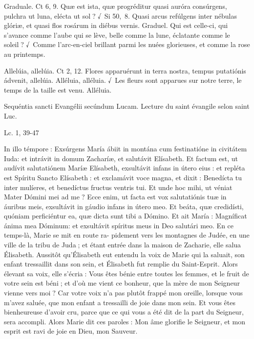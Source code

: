 \begin{paracol}{2}
Graduale. Ct 6, 9. Quæ est ista, quæ progréditur quasi auróra consúrgens, pulchra ut luna, elécta ut sol ? √~Si 50, 8. Quasi arcus refúlgens inter nébulas glóriæ, et quasi flos rosárum in diébus vernis.
\switchcolumn
Graduel. Qui est celle-ci, qui s’avance comme l’aube qui se lève, belle comme la lune, éclatante comme le soleil ? √~Comme l’arc-en-ciel brillant parmi les nuées glorieuses, et comme la rose au printemps.
\switchcolumn*

Allelúia, allelúia. Ct 2, 12. Flores apparuérunt in terra nostra, tempus putatiónis ádvenit, allelúia.
\switchcolumn
Alléluia, alléluia. √~Les fleurs sont apparues sur notre terre, le temps de la taille est venu. Alléluia.
\switchcolumn*

Sequéntia sancti Evangélii secúndum Lucam.
\switchcolumn
Lecture du saint évangile selon saint Luc.
\switchcolumn*

Lc. 1, 39-47
\switchcolumn

\switchcolumn*

In illo témpore : Exsúrgens María ábiit in montána cum festinatióne in civitátem Iuda: et intrávit in domum Zacharíæ, et salutávit Elísabeth. Et factum est, ut audívit salutatiónem Maríæ Elísabeth, exsultávit infans in útero eius : et repléta est Spíritu Sancto Elísabeth : et exclamávit voce magna, et dixit : Benedícta tu inter mulíeres, et benedíctus fructus ventris tui. Et unde hoc mihi, ut véniat Mater Dómini mei ad me ? Ecce enim, ut facta est vox salutatiónis tuæ in áuribus meis, exsultávit in gáudio infans in útero meo. Et beáta, quæ credidísti, quóniam perficiéntur ea, quæ dicta sunt tibi a Dómino. Et ait María : Magníficat ánima mea Dóminum: et exsultávit spíritus meus in Deo salutári meo.
\switchcolumn
En ce temps-là, Marie se mit en route ra- pidement vers les montagnes de Judée, en une ville de la tribu de Juda ; et étant entrée dans la maison de Zacharie, elle salua Élisabeth. Aussitôt qu’Élisabeth eut entendu la voix de Marie qui la saluait, son enfant tressaillit dans son sein, et Élisabeth fut remplie du Saint-Esprit. Alors élevant sa voix, elle s’écria : Vous êtes bénie entre toutes les femmes, et le fruit de votre sein est béni ; et d’où me vient ce bonheur, que la mère de mon Seigneur vienne vers moi ? Car votre voix n’a pas plutôt frappé mon oreille, lorsque vous m’avez saluée, que mon enfant a tressailli de joie dans mon sein. Et vous êtes bienheureuse d’avoir cru, parce que ce qui vous a été dit de la part du Seigneur, sera accompli. Alors Marie dit ces paroles : Mon âme glorifie le Seigneur, et mon esprit est ravi de joie en Dieu, mon Sauveur.
\switchcolumn*


\end{paracol}
